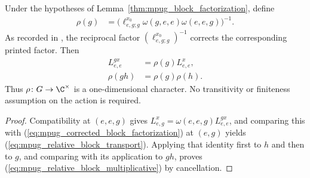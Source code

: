 \begin{lemma}
    \label{thm:mpug_relative_block_character}
    \leanok
    Under the hypotheses of Lemma~\ref{thm:mpug_block_factorization}, define
    \begin{align}
        \rho(g)
         & =\bigl(\ell^{x_0}_{e,g;g}\omega(g,e,e)
        \omega(e,e,g)\bigr)^{-1}.
        \label{eq:mpug_relative_block_character}
    \end{align}
    As recorded in \cite{gap:fbc25_block_independence_reciprocal_errors}, the
    reciprocal factor $(\ell^{x_0}_{e,g;g})^{-1}$ corrects the corresponding
    printed factor. Then
    \begin{align}
        L^{g x}_{e,e}
         & =\rho(g)L^x_{e,e},
        \label{eq:mpug_relative_block_transport} \\
        \rho(gh)
         & =\rho(g)\rho(h).
        \label{eq:mpug_relative_block_multiplicative}
    \end{align}
    Thus $\rho\colon G\to\C^\times$ is a one-dimensional character. No
    transitivity or finiteness assumption on the action is required.
\end{lemma}
\begin{proof}\leanok
    Compatibility at $(e,e,g)$ gives
    $L^x_{e,g}=\omega(e,e,g)L^{g x}_{e,e}$, and comparing this with
    (\ref{eq:mpug_corrected_block_factorization}) at $(e,g)$ yields
    (\ref{eq:mpug_relative_block_transport}). Applying that identity first
    to $h$ and then to $g$, and comparing with its application to $gh$, proves
    (\ref{eq:mpug_relative_block_multiplicative}) by cancellation.
\end{proof}

